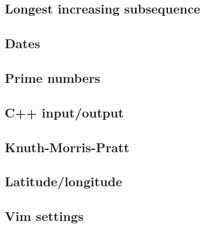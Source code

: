 \subsection{Longest increasing subsequence}
\raggedbottom
\hrulefill
\subsection{Dates}
\raggedbottom
\hrulefill
\subsection{Prime numbers}
\raggedbottom
\hrulefill
\subsection{C++ input/output}
\raggedbottom
\hrulefill
\subsection{Knuth-Morris-Pratt}
\raggedbottom
\hrulefill
\subsection{Latitude/longitude}
\raggedbottom
\hrulefill
\subsection{Vim settings}
\raggedbottom
\hrulefill

